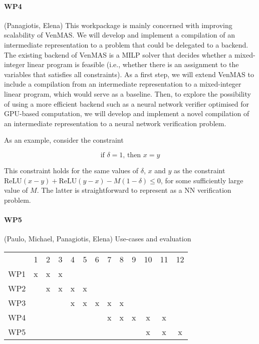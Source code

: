\documentclass[11pt]{article}
\begin{document}
\paragraph{WP4} (Panagiotis, Elena) This workpackage is mainly
concerned with improving scalability of VenMAS. We will develop and
implement a compilation of an intermediate representation to a problem
that could be delegated to a backend. The existing backend of VenMAS
is a MILP solver that decides whether a mixed-integer linear program
is feasible (i.e., whether there is an assignment to the variables
that satisfies all constraints). As a first step, we will extend
VenMAS to include a compilation from an intermediate representation to
a mixed-integer linear program, which would serve as a baseline.
Then, to explore the possibility of using a more efficient backend
such as a neural network verifier optimised for GPU-based computation,
we will develop and implement a novel compilation of an intermediate
representation to a neural network verification problem.

As an example, consider the constraint

\[
    \text{if }\delta = 1\text{, then }x = y
\]

This constraint holds for the same values of $\delta$, $x$ and $y$ as
the constraint
$\text{ReLU}(x-y) + \text{ReLU}(y-x) - M(1 - \delta) \leq 0$, for some
sufficiently large value of $M$. The latter is straightforward to
represent as a NN verification problem.

\paragraph{WP5} (Paulo, Michael, Panagiotis, Elena) Use-cases and evaluation 

\begin{center}
  \begin{tabular}{ccccccccccccc}
    & 1 & 2 & 3& 4& 5 & 6 &7 &8& 9&10&11&12\\
    WP1& x & x & x \\
    WP2&   & x & x & x & x &   & \\
    WP3&   &   &   & x & x & x & x & x & \\
    WP4&   &   &   &   &   &   & x & x & x & x & x &   \\
    WP5&   &   &   &   &   &   &   &   &   & x & x & x \\
  \end{tabular}
\end{center}
\end{document}
